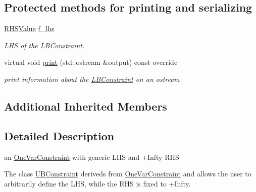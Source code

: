 \subsection*{Protected methods for printing and serializing}
\begin{DoxyCompactItemize}
\item 
\mbox{\label{class_s_m_spp__di__unipi__it_1_1_l_b_constraint_a4a07fa1468749fabf1ebf66e97011086}} 
\mbox{\hyperlink{class_s_m_spp__di__unipi__it_1_1_row_constraint_a8813536ab3b13a81c8e83a999ade3bd8}{R\+H\+S\+Value}} \mbox{\hyperlink{class_s_m_spp__di__unipi__it_1_1_l_b_constraint_a4a07fa1468749fabf1ebf66e97011086}{f\+\_\+lhs}}
\begin{DoxyCompactList}\small\item\em L\+HS of the \mbox{\hyperlink{class_s_m_spp__di__unipi__it_1_1_l_b_constraint}{L\+B\+Constraint}}. \end{DoxyCompactList}\item 
\mbox{\label{class_s_m_spp__di__unipi__it_1_1_l_b_constraint_a59a9fcbf8f9f86d348344b2073644b0e}} 
virtual void \mbox{\hyperlink{class_s_m_spp__di__unipi__it_1_1_l_b_constraint_a59a9fcbf8f9f86d348344b2073644b0e}{print}} (std\+::ostream \&output) const override
\begin{DoxyCompactList}\small\item\em print information about the \mbox{\hyperlink{class_s_m_spp__di__unipi__it_1_1_l_b_constraint}{L\+B\+Constraint}} on an ostream \end{DoxyCompactList}\end{DoxyCompactItemize}
\subsection*{Additional Inherited Members}


\subsection{Detailed Description}
an \mbox{\hyperlink{class_s_m_spp__di__unipi__it_1_1_one_var_constraint}{One\+Var\+Constraint}} with generic L\+HS and +\+Infty R\+HS 

The class \mbox{\hyperlink{class_s_m_spp__di__unipi__it_1_1_u_b_constraint}{U\+B\+Constraint}} deriveds from \mbox{\hyperlink{class_s_m_spp__di__unipi__it_1_1_one_var_constraint}{One\+Var\+Constraint}} and allows the user to arbitrarily define the L\+HS, while the R\+HS is fixed to +\+Infty. 

